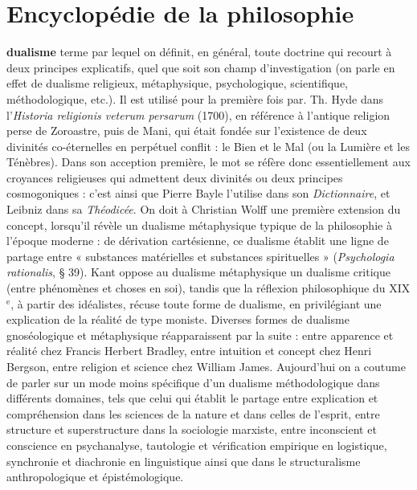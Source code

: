 
\section{Encyclopédie de la philosophie}

{\bf dualisme}  terme par lequel on définit, en
général, toute doctrine qui recourt à deux
principes explicatifs, quel que soit son
%
champ d'investigation (on parle en effet
de dualisme religieux, métaphysique, psychologique, scientifique, méthodologique,
etc.). Il est utilisé pour la première fois
par. Th. Hyde dans l’{\it Historia religionis
veterum persarum} (1700), en référence à
l'antique religion perse de Zoroastre, puis
de Mani, qui était fondée sur l’existence
de deux divinités co-éternelles en perpétuel conflit : le Bien et le Mal (ou la
Lumière et les Ténèbres). Dans son
acception première, le mot se réfère donc
essentiellement aux croyances religieuses
qui admettent deux divinités ou deux
principes cosmogoniques : c’est ainsi que
Pierre Bayle l'utilise dans son {\it Dictionnaire}, et Leibniz dans sa {\it Théodicée}. On
doit à Christian Wolff une première
extension du concept, lorsqu'il révèle un
dualisme métaphysique typique de la philosophie à l’époque moderne : de dérivation cartésienne, ce dualisme établit une
ligne de partage entre « substances matérielles et substances spirituelles » ({\it Psychologia rationalis}, § 39). Kant oppose au
dualisme métaphysique un dualisme critique (entre phénomènes et choses en
soi), tandis que la réflexion philosophique
du {\footnotesize XIX}$^\text{e}$, à partir des idéalistes, récuse
toute forme de dualisme, en privilégiant
une explication de la réalité de type
moniste. Diverses formes de dualisme
gnoséologique et métaphysique réapparaissent par la suite : entre apparence et
réalité chez Francis Herbert Bradley,
entre intuition et concept chez Henri
Bergson, entre religion et science chez
William James. Aujourd’hui on a coutume de parler sur un mode moins spécifique d’un dualisme méthodologique dans
différents domaines, tels que celui qui établit le partage entre explication et
compréhension dans les sciences de la
nature et dans celles de l’esprit, entre
structure et superstructure dans la sociologie marxiste, entre inconscient et
conscience en psychanalyse, tautologie et
vérification empirique en logistique,
synchronie et diachronie en linguistique
ainsi que dans le structuralisme anthropologique et épistémologique.

 


 
